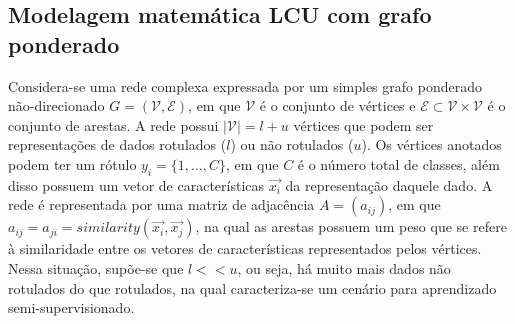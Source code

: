 \begin{figure}[h!]
  \captionsetup{width=8.5cm}
  \centering
  {}
\end{figure}
\FloatBarrier{}


\subsection{Modelagem matemática LCU com grafo ponderado}\label{sec:lcu-math}

Considera-se uma rede complexa expressada por um simples grafo
ponderado não-direcionado $G = (\mathcal{V}, \mathcal{E})$, em que $\mathcal{V}$ é o conjunto de
vértices e $\mathcal{E} \subset \mathcal{V} \times \mathcal{V}$ é o conjunto de arestas. A rede possui
$\left|\mathcal{V}\right| = l + u$ vértices que podem ser representações de
dados rotulados ($ l $) ou não rotulados ($ u $). Os vértices anotados
podem ter um rótulo $y_i = \{1, \ldots, C\}$, em que $C$ é o número total de
classes, além disso possuem um vetor de características $\vec{x_i}$ da
representação daquele dado. A rede é representada por uma matriz de
adjacência $A = (a_{ij})$, em que $a_{ij} =a_{ji} =
similarity(\vec{x_i}, \vec{x_j})$, na qual as arestas possuem um peso
que se refere à similaridade entre os vetores de características
representados pelos vértices. Nessa situação, supõe-se que $l << u$,
ou seja, há muito mais dados não rotulados do que rotulados, na qual
caracteriza-se um cenário para aprendizado semi-supervisionado.

